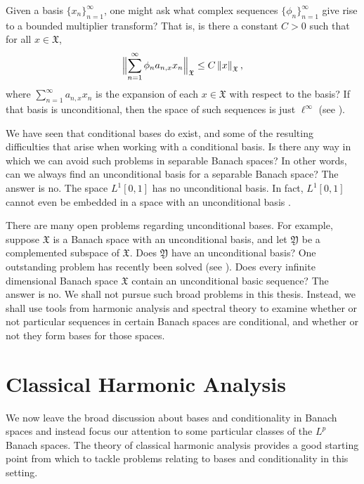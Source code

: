 \documentclass[honours,12pt]{unswthesis}
\newcommand{\X}{\mathfrak{X}}
\newcommand{\Y}{\mathfrak{Y}}
\def\norm#1{\left \Vert #1 \right \Vert}
\def\snorm#1{\Bigl \Vert #1 \Bigr \Vert}
\numberwithin{equation}{section}
\begin{document}
Given a basis $\{x_n\}_{n=1}^{\infty}$, one might ask what
complex sequences $\{\phi_n\}_{n=1}^{\infty}$ give rise to a bounded multiplier
transform? That is, is there a constant $C>0$ such that for all $x\in\X$,
\[\snorm{\sum_{n=1}^{\infty}\phi_na_{n,x}x_n}_{\X}\leq C\norm{x}_{\X},\]
where $\sum_{n=1}^{\infty}a_{n,x}x_n$ is the expansion of each $x\in\X$ with
respect to the basis? If that basis is unconditional, then the space of such
sequences is just $\ell^{\infty}$ (see \cite[Proposition 1.c.7]{Lind}).


We have seen that conditional bases do exist, and some of the resulting
difficulties that arise when working with a conditional basis. Is there any way
in which we can avoid such problems in separable Banach spaces? In other words,
can we always find an unconditional
basis for a separable Banach space? The answer is no. The space $L^1[0,1]$ has
no unconditional basis. In fact, $L^1[0,1]$ cannot even be embedded in a space
with an unconditional basis \cite[Propostion 1.d.1]{Lind}.

There are many open problems regarding unconditional bases. For example,
suppose $\X$ is a Banach space with an unconditional basis, and let $\Y$ be
a complemented subspace of $\X$. Does $\Y$ have an unconditional basis? One
outstanding problem has recently been solved (see \cite{Gowers}).
Does every infinite dimensional Banach space $\X$ contain an unconditional
basic sequence? The answer is no.
We shall not pursue such broad problems in this thesis. Instead, we shall use 
tools from harmonic analysis and spectral theory to examine whether or not
particular sequences in certain Banach spaces are conditional, and whether or 
not
they form bases for those spaces.






\chapter{Classical Harmonic Analysis}\label{cha}





We now
leave the broad discussion about bases and conditionality in Banach spaces and
instead focus our attention to some particular classes of the $L^p$ Banach
spaces. The theory of classical harmonic analysis provides a good starting point
from which to tackle problems relating to bases and conditionality in this 
setting.
\end{document}
